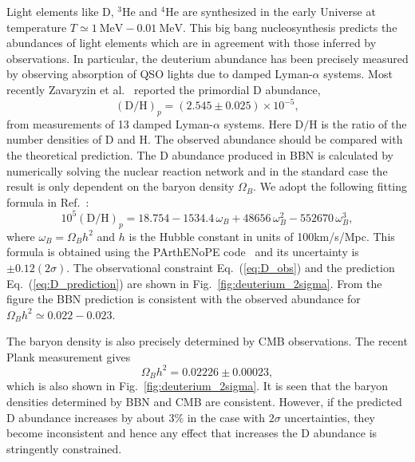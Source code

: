 \documentclass[11pt,a4paper]{article}
\begin{document}
Light elements like D, $^3$He and $^4$He are synthesized in the early Universe at temperature $T\simeq 1~\text{MeV}-0.01~\text{MeV}$.
This big bang nucleosynthesis predicts the abundances of light elements which are in agreement with those inferred by observations.
In particular, the deuterium abundance has been precisely measured by observing absorption of QSO lights due to damped Lyman-$\alpha$ systems.
Most recently Zavaryzin et al.~\cite{Zavarygin:2018dbk} reported the primordial D abundance,
%
\begin{equation}
    (\text{D}/\text{H})_p = (2.545 \pm 0.025)\times 10^{-5},
    \label{eq:D_obs}
\end{equation}
from measurements of 13 damped Lyman-$\alpha$ systems.
Here $\text{D}/\text{H}$ is the ratio of the number densities of D and H.
The observed abundance should be compared with the theoretical prediction.
The D abundance produced in BBN is calculated by numerically solving the nuclear reaction network and in the standard case the result is only dependent on the baryon density $\Omega_B$.
We adopt the following fitting formula in Ref.~\cite{Ade:2015xua}:
\begin{equation}
    10^5 (\text{D}/\text{H})_p = 18.754-1534.4\,\omega_B 
    + 48656\,\omega_B^2
    -552670\,\omega_B^3,
    \label{eq:D_prediction}
\end{equation}
where $\omega_B = \Omega_B h^2$ and $h$ is the Hubble constant in units of 100km/s/Mpc.
This formula is obtained using the PArthENoPE code~\cite{Pisanti:2007hk} and its uncertainty is $\pm 0.12 (2\sigma)$.
The observational constraint Eq.~(\ref{eq:D_obs}) and the prediction Eq.~(\ref{eq:D_prediction}) are shown in Fig.~\ref{fig:deuterium_2sigma}.
From the figure the BBN prediction is consistent with the observed abundance for $\Omega_B h^2 \simeq 0.022-0.023$.

The baryon density is also precisely determined by CMB observations.
The recent Plank measurement gives
\begin{equation}
    \Omega_B h^2 = 0.02226\pm 0.00023,
\end{equation}
which is also shown in Fig.~\ref{fig:deuterium_2sigma}.
It is seen that the baryon densities determined by BBN and CMB are consistent.
However, if the predicted D abundance increases by about 3\% in the case with $2\sigma$ uncertainties, 
 they become inconsistent and hence any effect that increases the D abundance is stringently constrained.
\end{document}
